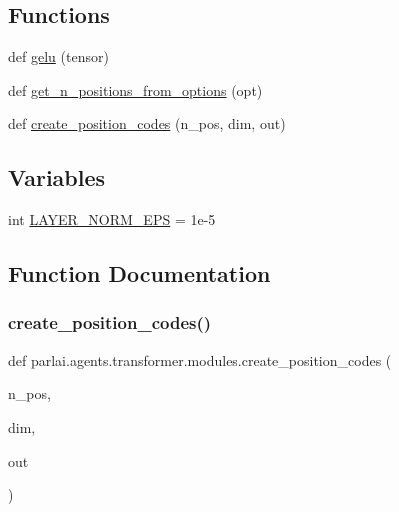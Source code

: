 \subsection*{Functions}
\begin{DoxyCompactItemize}
\item 
def \hyperlink{namespaceparlai_1_1agents_1_1transformer_1_1modules_ad93916b8d2188c35733089e1581c44f8}{gelu} (tensor)
\item 
def \hyperlink{namespaceparlai_1_1agents_1_1transformer_1_1modules_ab67607512c597ddd54f2b60a1a1eaf4c}{get\+\_\+n\+\_\+positions\+\_\+from\+\_\+options} (opt)
\item 
def \hyperlink{namespaceparlai_1_1agents_1_1transformer_1_1modules_a0b86437e6e9682fa3100e9cadcaae259}{create\+\_\+position\+\_\+codes} (n\+\_\+pos, dim, out)
\end{DoxyCompactItemize}
\subsection*{Variables}
\begin{DoxyCompactItemize}
\item 
int \hyperlink{namespaceparlai_1_1agents_1_1transformer_1_1modules_afb85e0862dd867aee20a92e26aa29f58}{L\+A\+Y\+E\+R\+\_\+\+N\+O\+R\+M\+\_\+\+E\+PS} = 1e-\/5
\end{DoxyCompactItemize}


\subsection{Function Documentation}
\mbox{\label{namespaceparlai_1_1agents_1_1transformer_1_1modules_a0b86437e6e9682fa3100e9cadcaae259}} 
\subsubsection{\texorpdfstring{create\+\_\+position\+\_\+codes()}{create\_position\_codes()}}
{\footnotesize\ttfamily def parlai.\+agents.\+transformer.\+modules.\+create\+\_\+position\+\_\+codes (\begin{DoxyParamCaption}\item[{}]{n\+\_\+pos,  }\item[{}]{dim,  }\item[{}]{out }\end{DoxyParamCaption})}

